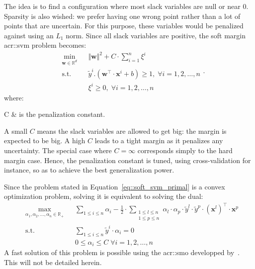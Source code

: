                 The idea is to find a configuration where most slack variables are null or near $0$.
                Sparsity is also wished: we prefer having one wrong point rather than a lot of points that are uncertain.
                For this purpose, these variables would be penalized against using an $L_1$ norm.
                Since all slack variables are positive, the soft margin \gls{acr::svm} problem becomes:
                \begin{equation}
                    \label{eq::soft_svm_primal}
                    \begin{aligned}
                        & \min_{\bm{w} \in \mathbb{R}^d}
                        & & {\Vert \bm{w} \Vert}^2 + C \cdot \sum_{i=1}^n \xi^i \\
                        & \text{s.t.} & & \tilde{y}^i.(\bm{w}^\intercal\cdot\bm{x}^i + b) \geq 1, \; \forall i = 1, 2, \dots, n\\
                        & & & \xi^i \geq 0, \; \forall i = 1, 2, \dots, n
                    \end{aligned}.
                \end{equation}
                where:
                \begin{conditions}
                    C & is the penalization constant.\\
                \end{conditions}

                A small $C$ means the slack variables are allowed to get big: the margin is expected to be big.
                A high $C$ leads to a tight margin as it penalizes any uncertainty.
                The special case where $C=\infty$ corresponds simply to the hard margin case.
                Hence, the penalization constant is tuned, using cross-validation for instance, so as to achieve the best generalization power.

                Since the problem stated in Equation~\ref{eq::soft_svm_primal} is a convex optimization problem, solving it is equivalent to solving the dual:
                \begin{equation}
                    \label{eq::soft_svm_dual}
                    \begin{aligned}
                        & \max_{\alpha_1, \alpha_2, \dots, \alpha_n \in \mathbb{R}_+}
                        & & \sum_{1\leq i \leq n} \alpha_i - \frac{1}{2}\cdot\sum_{\substack{1\leq l \leq n\\1\leq p \leq n}}\alpha_l\cdot\alpha_p\cdot\tilde{y}^l\cdot\tilde{y}^p\cdot(\bm{x}^l)^\intercal\cdot\bm{x}^p\\
                        &\text{s.t.} & & \sum_{1 \leq i \leq n}\tilde{y}^i\cdot\alpha_i=0 \\
                        & & & 0 \leq \alpha_i \leq C \;\forall i=1,2,\dots,n
                        \end{aligned}
                \end{equation}
                A fast solution of this problem is possible using the \gls{acr::smo} developped by~\textcite{platt1998sequential}.
                This will not be detailed herein. 

